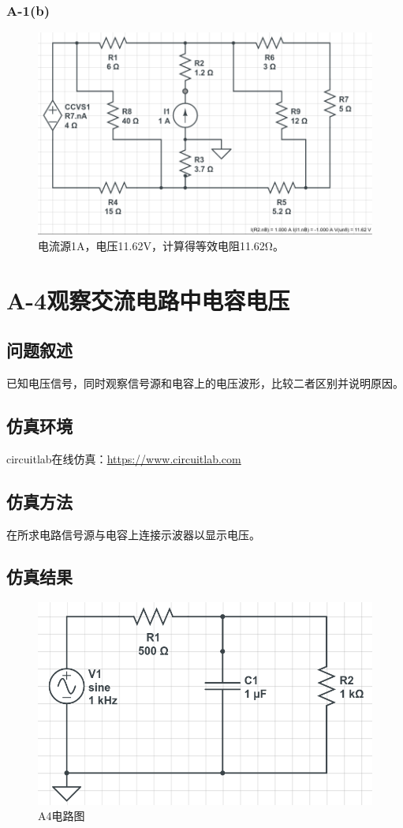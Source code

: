 \documentclass[a4paper]{article}
\begin{document}
\subsubsection{A-1(b)}
\begin{figure}[htp]
\centering
\includegraphics[width=1\linewidth]{A2.png}
\caption{电流源1A，电压11.62V，计算得等效电阻11.62Ω。}
\label{A1b}
\end{figure}

\section{A-4观察交流电路中电容电压}
\subsection{问题叙述}
已知电压信号，同时观察信号源和电容上的电压波形，比较二者区别并说明原因。
\subsection{仿真环境}
circuitlab在线仿真：\url{https://www.circuitlab.com}
\subsection{仿真方法}
在所求电路信号源与电容上连接示波器以显示电压。
\subsection{仿真结果}
\begin{figure}[htp]
\centering
\includegraphics[width=1\linewidth]{A4.png}
\caption{A4电路图}
\label{A41}
\end{figure}
\end{document}
